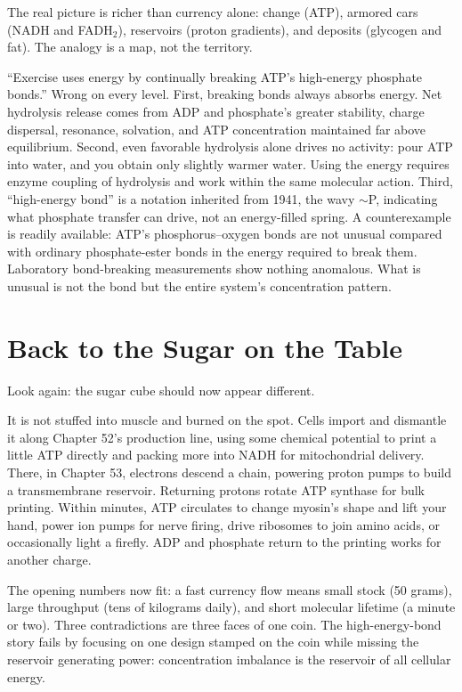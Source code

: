 The real picture is richer than currency alone: change (ATP), armored cars (NADH and FADH$_2$), reservoirs (proton gradients), and deposits (glycogen and fat). The analogy is a map, not the territory.

\begin{wuqu}
``Exercise uses energy by continually breaking ATP's high-energy phosphate bonds.'' Wrong on every level. First, breaking bonds always absorbs energy. Net hydrolysis release comes from ADP and phosphate's greater stability, charge dispersal, resonance, solvation, and ATP concentration maintained far above equilibrium. Second, even favorable hydrolysis alone drives no activity: pour ATP into water, and you obtain only slightly warmer water. Using the energy requires enzyme coupling of hydrolysis and work within the same molecular action. Third, ``high-energy bond'' is a notation inherited from 1941, the wavy $\sim$P, indicating what phosphate transfer can drive, not an energy-filled spring. A counterexample is readily available: ATP's phosphorus--oxygen bonds are not unusual compared with ordinary phosphate-ester bonds in the energy required to break them. Laboratory bond-breaking measurements show nothing anomalous. What is unusual is not the bond but the entire system's concentration pattern.
\end{wuqu}

\section{Back to the Sugar on the Table}

Look again: the sugar cube should now appear different.

It is not stuffed into muscle and burned on the spot. Cells import and dismantle it along Chapter 52's production line, using some chemical potential to print a little ATP directly and packing more into NADH for mitochondrial delivery. There, in Chapter 53, electrons descend a chain, powering proton pumps to build a transmembrane reservoir. Returning protons rotate ATP synthase for bulk printing. Within minutes, ATP circulates to change myosin's shape and lift your hand, power ion pumps for nerve firing, drive ribosomes to join amino acids, or occasionally light a firefly. ADP and phosphate return to the printing works for another charge.

The opening numbers now fit: a fast currency flow means small stock (50 grams), large throughput (tens of kilograms daily), and short molecular lifetime (a minute or two). Three contradictions are three faces of one coin. The high-energy-bond story fails by focusing on one design stamped on the coin while missing the reservoir generating power: concentration imbalance is the reservoir of all cellular energy.


